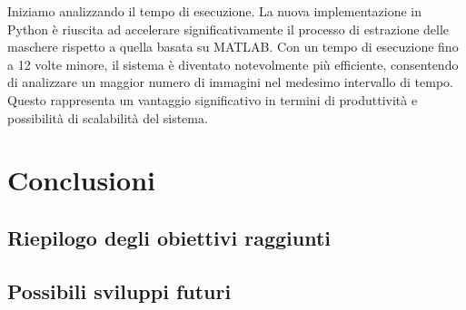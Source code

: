 \documentclass[a4paper,12pt]{report}
\begin{document}
    Iniziamo analizzando il tempo di esecuzione. La nuova implementazione in Python è riuscita ad accelerare significativamente il processo di estrazione delle maschere rispetto a quella basata su MATLAB. Con un tempo di esecuzione fino a 12 volte minore, il sistema è diventato notevolmente più efficiente, consentendo di analizzare un maggior numero di immagini nel medesimo intervallo di tempo. Questo rappresenta un vantaggio significativo in termini di produttività e possibilità di scalabilità del sistema.
      
\chapter{Conclusioni}
  \section{Riepilogo degli obiettivi raggiunti}
  \section{Possibili sviluppi futuri}
  
  
\end{document}
